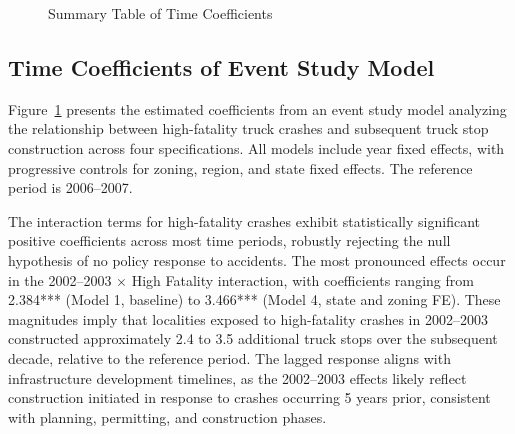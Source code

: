 \documentclass[
  8pt,
  12pt]{article}
\begin{document}
\begin{figure}


\caption{\label{fig-SummaryTable}Summary Table of Time Coefficients}

\end{figure}%

\subsection{Time Coefficients of Event Study
Model}\label{time-coefficients-of-event-study-model}

Figure~\ref{fig-SummaryTable} presents the estimated coefficients from
an event study model analyzing the relationship between high-fatality
truck crashes and subsequent truck stop construction across four
specifications. All models include year fixed effects, with progressive
controls for zoning, region, and state fixed effects. The reference
period is 2006--2007.

The interaction terms for high-fatality crashes exhibit statistically
significant positive coefficients across most time periods, robustly
rejecting the null hypothesis of no policy response to accidents. The
most pronounced effects occur in the 2002--2003 × High Fatality
interaction, with coefficients ranging from 2.384*** (Model 1, baseline)
to 3.466*** (Model 4, state and zoning FE). These magnitudes imply that
localities exposed to high-fatality crashes in 2002--2003 constructed
approximately 2.4 to 3.5 additional truck stops over the subsequent
decade, relative to the reference period. The lagged response aligns
with infrastructure development timelines, as the 2002--2003 effects
likely reflect construction initiated in response to crashes occurring 5
years prior, consistent with planning, permitting, and construction
phases.
\end{document}
